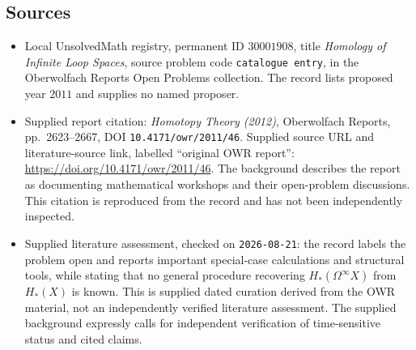 \documentclass[11pt]{article}
\begin{document}
\subsection{Sources}
\begin{itemize}
\item Local UnsolvedMath registry, permanent ID \(30001908\), title \emph{Homology of Infinite Loop Spaces}, source problem code \texttt{catalogue entry}, in the Oberwolfach Reports Open Problems collection. The record lists proposed year \(2011\) and supplies no named proposer.
\item Supplied report citation: \emph{Homotopy Theory (2012)}, Oberwolfach Reports, pp.\ 2623--2667, DOI \texttt{10.4171/owr/2011/46}. Supplied source URL and literature-source link, labelled ``original OWR report'': \url{https://doi.org/10.4171/owr/2011/46}. The background describes the report as documenting mathematical workshops and their open-problem discussions. This citation is reproduced from the record and has not been independently inspected.
\item Supplied literature assessment, checked on \texttt{2026-08-21}: the record labels the problem open and reports important special-case calculations and structural tools, while stating that no general procedure recovering \(H_*(\Omega^\infty X)\) from \(H_*(X)\) is known. This is supplied dated curation derived from the OWR material, not an independently verified literature assessment. The supplied background expressly calls for independent verification of time-sensitive status and cited claims.
\end{itemize}
\end{document}
